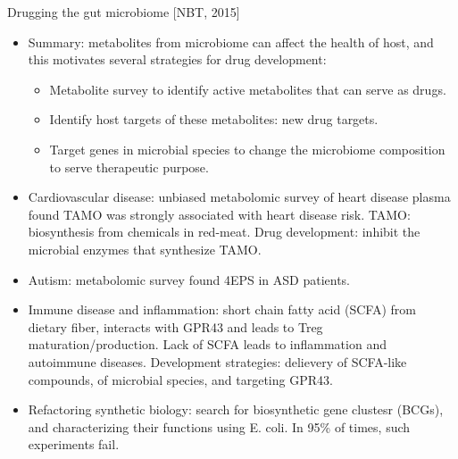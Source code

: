 \documentclass{report}
\begin{document}
Drugging the gut microbiome [NBT, 2015]
\begin{itemize}
\item Summary: metabolites from microbiome can affect the health of host, and this motivates several strategies for drug development: 
\begin{itemize}
	\item Metabolite survey to identify active metabolites that can serve as drugs. 
	\item Identify host targets of these metabolites: new drug targets.
	\item Target genes in microbial species to change the microbiome composition to serve therapeutic purpose.  
\end{itemize} 

\item Cardiovascular disease: unbiased metabolomic survey of heart disease plasma found TAMO was strongly associated with heart disease risk. TAMO: biosynthesis from chemicals in red-meat. Drug development: inhibit the microbial enzymes that synthesize TAMO.  

\item Autism: metabolomic survey found 4EPS in ASD patients.  

\item Immune disease and inflammation: short chain fatty acid (SCFA) from dietary fiber, interacts with GPR43 and leads to Treg maturation/production. Lack of SCFA leads to inflammation and autoimmune diseases. Development strategies: delievery of SCFA-like compounds, of microbial species, and targeting GPR43. 

\item Refactoring synthetic biology: search for biosynthetic gene clustesr (BCGs), and characterizing their functions using E. coli. In 95\% of times, such experiments fail.  
\end{itemize}
\end{document}
